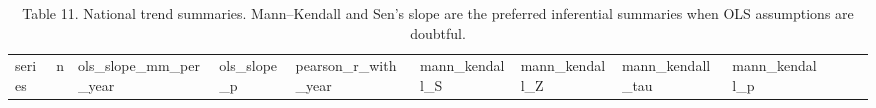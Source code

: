 \documentclass[
]{article}
\begin{document}
\begin{longtable}[]{@{}
  >{\raggedright\arraybackslash}p{}
  >{\raggedleft\arraybackslash}p{}
  >{\raggedleft\arraybackslash}p{}
  >{\raggedleft\arraybackslash}p{}
  >{\raggedleft\arraybackslash}p{}
  >{\raggedleft\arraybackslash}p{}
  >{\raggedleft\arraybackslash}p{}
  >{\raggedleft\arraybackslash}p{}
  >{\raggedleft\arraybackslash}p{}
  >{\raggedleft\arraybackslash}p{}
  >{\raggedleft\arraybackslash}p{}
  >{\raggedleft\arraybackslash}p{}@{}}
\caption{Table 11. National trend summaries. Mann--Kendall and Sen's
slope are the preferred inferential summaries when OLS assumptions are
doubtful.}\tabularnewline
\toprule\noalign{}
\begin{minipage}[b]{\linewidth}\raggedright
series
\end{minipage} & \begin{minipage}[b]{\linewidth}\raggedleft
n
\end{minipage} & \begin{minipage}[b]{\linewidth}\raggedleft
ols\_slope\_mm\_per\_year
\end{minipage} & \begin{minipage}[b]{\linewidth}\raggedleft
ols\_slope\_p
\end{minipage} & \begin{minipage}[b]{\linewidth}\raggedleft
pearson\_r\_with\_year
\end{minipage} & \begin{minipage}[b]{\linewidth}\raggedleft
mann\_kendall\_S
\end{minipage} & \begin{minipage}[b]{\linewidth}\raggedleft
mann\_kendall\_Z
\end{minipage} & \begin{minipage}[b]{\linewidth}\raggedleft
mann\_kendall\_tau
\end{minipage} & \begin{minipage}[b]{\linewidth}\raggedleft
mann\_kendall\_p
\end{minipage} & \begin{minipage}[b]{\linewidth}\raggedleft

\end{minipage}
\end{longtable}
\end{document}
